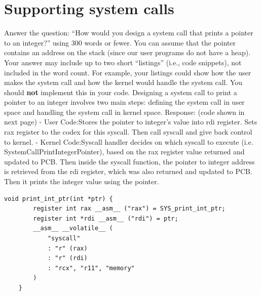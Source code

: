 \documentclass[parskip=half]{scrarticle}
\begin{document}
\newpage

\section{Supporting system calls}

Answer the question:
``How would you design a system call that prints a pointer to an integer?''
using 300 words or fewer.
You can assume that the pointer contains an address on the stack (since our user programs do not have a heap).
Your answer may include up to two short ``listings'' (i.e., code snippets), not included in the word count.
For example, your listings could show how the user makes the system call and how the kernel would handle the system call.
You should \textbf{not} implement this in your code.
Designing a system call to print a pointer to an integer involves two main steps: defining the system call in user space and handling the system call in kernel space.
\newline\newline\newline
Response: (code shown in next page)\newline
 - User Code:\newline Stores the pointer to integer’s value into rdi register. Sets rax register to the codex for this syscall. Then call syscall and give back control to kernel.\newline
 - Kernel Code:\newline Syscall handler decides on which syscall to execute (i.e. SystemCallPrintIntegerPointer), based on the rax register value returned and updated to PCB. Then inside the syscall function, the pointer to integer address is retrieved from the rdi register, which was also returned and updated to PCB. Then it prints the integer value using the pointer.\newline

\newpage

\begin{lstlisting}[caption=User Code System Call, label=l:userspace]
    void print_int_ptr(int *ptr) {
        register int rax __asm__ ("rax") = SYS_print_int_ptr;
        register int *rdi __asm__ ("rdi") = ptr;
        __asm__ __volatile__ (
            "syscall" 
            : "r" (rax)
            : "r" (rdi)
            : "rcx", "r11", "memory"
        )
    }
    \end{lstlisting}
    
\end{document}
